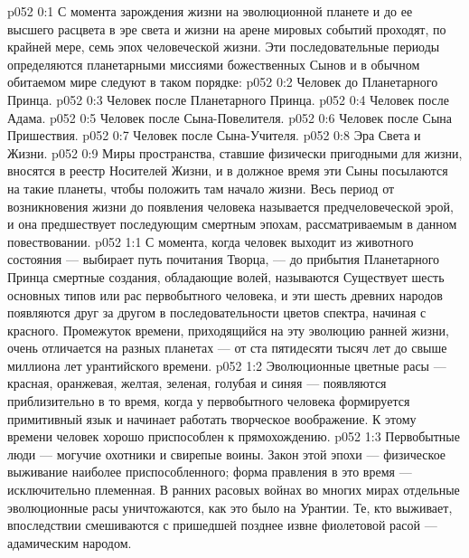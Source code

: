 \author{Могучий Вестник}
\vs p052 0:1 С момента зарождения жизни на эволюционной планете и до ее высшего расцвета в эре света и жизни на арене мировых событий проходят, по крайней мере, семь эпох человеческой жизни. Эти последовательные периоды определяются планетарными миссиями божественных Сынов и в обычном обитаемом мире следуют в таком порядке:
\vs p052 0:2 \bibnobreakspace Человек до Планетарного Принца.
\vs p052 0:3 \bibnobreakspace Человек после Планетарного Принца.
\vs p052 0:4 \bibnobreakspace Человек после Адама.
\vs p052 0:5 \bibnobreakspace Человек после Сына\hyp{}Повелителя.
\vs p052 0:6 \bibnobreakspace Человек после Сына Пришествия.
\vs p052 0:7 \bibnobreakspace Человек после Сына\hyp{}Учителя.
\vs p052 0:8 \bibnobreakspace Эра Света и Жизни.
\vs p052 0:9 \pc Миры пространства, ставшие физически пригодными для жизни, вносятся в реестр Носителей Жизни, и в должное время эти Сыны посылаются на такие планеты, чтобы положить там начало жизни. Весь период от возникновения жизни до появления человека называется предчеловеческой эрой, и она предшествует последующим смертным эпохам, рассматриваемым в данном повествовании.
\vs p052 1:1 С момента, когда человек выходит из животного состояния --- выбирает путь почитания Творца, --- до прибытия Планетарного Принца смертные создания, обладающие волей, называются  Существует шесть основных типов или рас первобытного человека, и эти шесть древних народов появляются друг за другом в последовательности цветов спектра, начиная с красного. Промежуток времени, приходящийся на эту эволюцию ранней жизни, очень отличается на разных планетах --- от ста пятидесяти тысяч лет до свыше миллиона лет урантийского времени.
\vs p052 1:2 Эволюционные цветные расы --- красная, оранжевая, желтая, зеленая, голубая и синяя --- появляются приблизительно в то время, когда у первобытного человека формируется примитивный язык и начинает работать творческое воображение. К этому времени человек хорошо приспособлен к прямохождению.
\vs p052 1:3 \pc Первобытные люди --- могучие охотники и свирепые воины. Закон этой эпохи --- физическое выживание наиболее приспособленного; форма правления в это время --- исключительно племенная. В ранних расовых войнах во многих мирах отдельные эволюционные расы уничтожаются, как это было на Урантии. Те, кто выживает, впоследствии смешиваются с пришедшей позднее извне фиолетовой расой --- адамическим народом.
